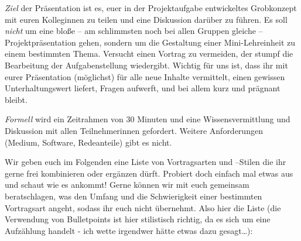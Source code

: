 \documentclass[DIV=15,headinclude=true]{scrreprt}
\begin{document}
\emph{Ziel} der Präsentation ist es, euer in der Projektaufgabe entwickeltes Grobkonzept mit euren Kolleginnen zu teilen und eine
Diskussion darüber zu führen. Es soll \emph{nicht} um eine bloße -- am
schlimmsten noch bei allen Gruppen gleiche -- Projektpräsentation gehen,
sondern um die Gestaltung einer Mini-Lehreinheit zu einem bestimmten
Thema. Versucht
einen Vortrag zu vermeiden, der stumpf die Bearbeitung der
Aufgabenstellung wiedergibt. Wichtig für uns ist, dass ihr mit eurer
Präsentation (möglichst) für alle neue Inhalte vermittelt, einen
gewissen Unterhaltungswert liefert, Fragen aufwerft, und bei allem kurz
und prägnant bleibt.

\emph{Formell} wird ein Zeitrahmen von 30 Minuten und eine
Wissensvermittlung und Diskussion mit allen Teilnehmerinnen gefordert. Weitere
Anforderungen (Medium, Software, Redeanteile) gibt es nicht.

Wir geben euch im Folgenden eine Liste von Vortragsarten
und --Stilen die ihr gerne frei kombinieren oder ergänzen dürft.
Probiert doch einfach mal etwas aus und schaut wie es ankommt! Gerne
können wir mit euch gemeinsam beratschlagen, was den Umfang und die
Schwierigkeit einer bestimmten Vortragsart angeht, sodass ihr euch nicht
übernehmt. Also hier die Liste (die Verwendung von Bulletpoints ist hier
stilistisch richtig, da es sich um eine Aufzählung handelt - ich wette
irgendwer hätte etwas dazu gesagt\ldots):
\end{document}

